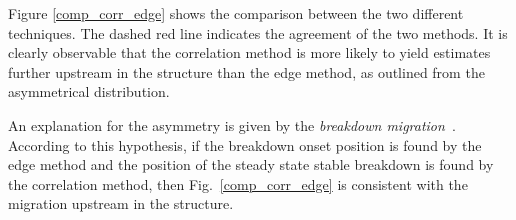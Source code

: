 Figure \ref{comp_corr_edge} shows the comparison between the two different techniques. The dashed red line indicates the agreement of the two methods. It is clearly observable that the correlation method is more likely to yield estimates further upstream in the structure than the edge method, as outlined from the asymmetrical distribution. 

An explanation for the asymmetry is given by the \textit{breakdown migration}~\cite{Woolley:2015,Jacewicz:CLICWS16,Degiovanni:migration}. According to this hypothesis, if the breakdown onset position is found by the edge method and the position of the steady state stable breakdown is found by the correlation method, then Fig.~\ref{comp_corr_edge} is consistent with the migration upstream in the structure. 

\begin{figure}[p]
\centering
   \hspace{1mm}

\end{figure}
